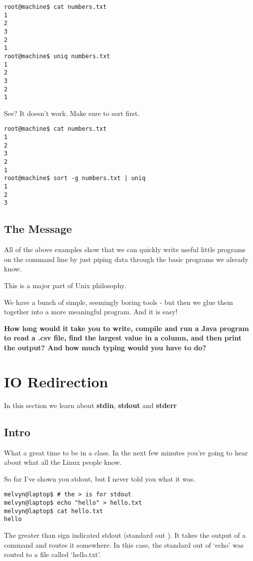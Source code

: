 \documentclass[12pt,a4paper]{article}
\begin{document}
\begin{lstlisting}[style=term]
root@machine$ cat numbers.txt
1
2
3
2
1
root@machine$ uniq numbers.txt
1
2
3
2
1
\end{lstlisting}


See? It doesn't work. Make sure to sort first.

\begin{lstlisting}[style=term]
root@machine$ cat numbers.txt
1
2
3
2
1
root@machine$ sort -g numbers.txt | uniq
1
2
3
\end{lstlisting}

\subsection{The Message}
All of the above examples show that we can quickly write useful little programs
on the command line by just piping data through the basic programs we already
know.

This is a major part of Unix philosophy.

We have a bunch of simple, seemingly boring tools - but then we glue them
together into a more meaningful program. And it is easy!

\textbf{How long would it take you to write, compile and run a Java program to
read a .csv file, find the largest value in a column, and then print the
output? And how much typing would you have to do?}

\section*{ IO Redirection }

In this section we learn about \textbf{stdin}, \textbf{stdout} and
\textbf{stderr}

\subsection*{Intro}
What a great time to be in a class. In the next few minutes you're going to hear
about what all the Linux people know.

So far I've shown you stdout, but I never told you what it was.
\begin{lstlisting}[style=term]
melvyn@laptop$ # the > is for stdout
melvyn@laptop$ echo "hello" > hello.txt
melvyn@laptop$ cat hello.txt
hello
\end{lstlisting} 

The greater than sign indicated stdout (standard out ). It takes the output of a
command and routes it somewhere. In this case, the standard out of `echo' was
routed to a file called `hello.txt'.
\end{document}
